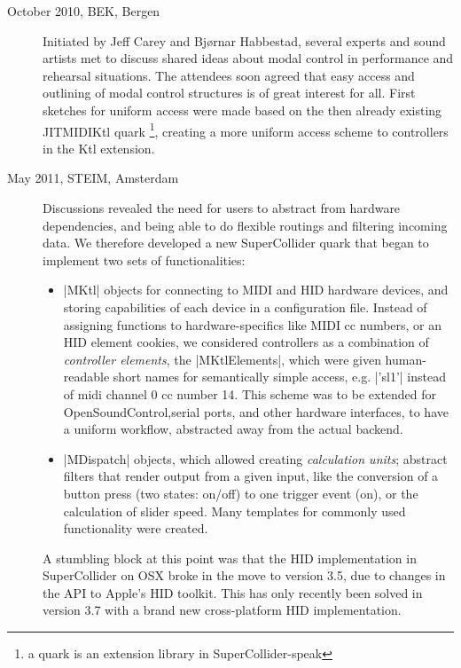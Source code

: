 \documentclass{article}
\newcommand{\todo}[1] {\emph{\textbf{TODO:} #1}}
\begin{document}
\begin{description}
	\item[October 2010, BEK, Bergen] Initiated by Jeff Carey and Bj\o{}rnar Habbestad, several experts and sound artists met to discuss shared ideas about modal control in performance and rehearsal situations.
	The attendees soon agreed that easy access and outlining of modal control structures is of great interest for all. First sketches for uniform access were made based on the then already existing JITMIDIKtl quark \footnote{a quark is an extension library in SuperCollider-speak}, creating a more uniform access scheme to controllers in the Ktl extension. 
	
	
	\item[May 2011, STEIM, Amsterdam] Discussions revealed the need for users to abstract from hardware dependencies, and being able to do flexible routings and filtering incoming data. We therefore developed a new SuperCollider quark that began to implement two sets of functionalities:
	
	\begin{itemize}
		\item 	|MKtl| objects for connecting to MIDI and HID hardware devices, and storing capabilities of each device in a configuration file.
		 Instead of assigning functions to hardware-specifics like MIDI cc numbers, or an HID element cookies, we considered controllers as a combination of \emph{controller elements}, the |MKtlElements|, which were given human-readable short names for semantically simple access, e.g. |'sl1'| instead of midi channel 0 cc number 14.
		 This scheme was to be extended for OpenSoundControl,serial ports, and other hardware interfaces, to have a uniform workflow, abstracted away from the actual backend.
		\item  |MDispatch| objects, which allowed creating \emph{calculation units}; abstract filters that render output from a given input, like the conversion of a button press (two states: on/off) to one trigger event (on), or the calculation of slider speed. Many templates for commonly used functionality were created.
	\end{itemize}
	
	A stumbling block at this point was that the HID implementation in SuperCollider on OSX broke in the move to version 3.5, due to changes in the API to Apple's HID toolkit. This has only recently been solved in version 3.7 with a brand new cross-platform HID implementation.
	

\end{description}
\end{document}
